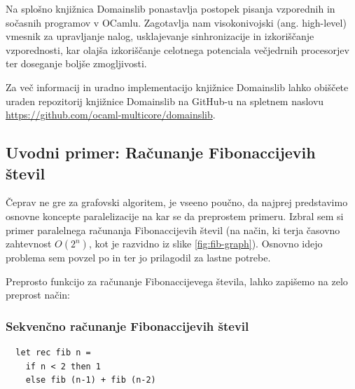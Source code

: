 \documentclass[mat1, tisk]{fmfdelo}
\begin{document}
Na splošno knjižnica Domainslib ponastavlja postopek pisanja vzporednih in sočasnih programov v OCamlu. 
Zagotavlja nam visokonivojski (ang. high-level) vmesnik za upravljanje nalog, usklajevanje sinhronizacije in
izkoriščanje vzporednosti, kar olajša izkoriščanje celotnega potenciala večjedrnih procesorjev ter doseganje boljše
zmogljivosti.

Za več informacij in uradno implementacijo knjižnice Domainslib lahko obiščete uraden repozitorij
knjižnice Domainslib na GitHub-u na spletnem naslovu \url{https://github.com/ocaml-multicore/domainslib}.


\subsection{Uvodni primer: Računanje Fibonaccijevih števil}

Čeprav ne gre za grafovski algoritem, je vseeno poučno, da najprej predstavimo osnovne koncepte
paralelizacije na kar se da preprostem primeru. Izbral sem si primer paralelnega računanja Fibonaccijevih števil
(na način, ki terja časovno zahtevnost $O(2^n)$, kot je razvidno iz slike \ref{fig:fib-graph}).
Osnovno idejo problema sem povzel po \cite{parallel_fib_computation} in \cite{multicore_ocaml_article} ter jo prilagodil
za lastne potrebe.

Preprosto funkcijo za računanje Fibonaccijevega števila, lahko zapišemo na zelo preprost način:

\subsubsection{Sekvenčno računanje Fibonaccijevih števil}

\begin{lstlisting}
  let rec fib n =
    if n < 2 then 1
    else fib (n-1) + fib (n-2)
\end{lstlisting}
\end{document}

